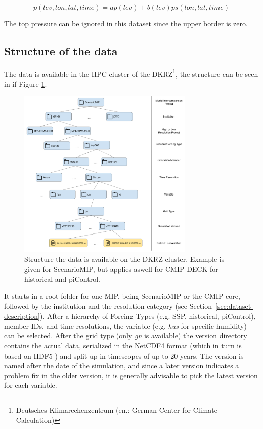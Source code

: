 \begin{equation}
\label{eq:mpige-sigma-hybrid-pressure}
p(lev, lon, lat, time) = ap(lev) + b(lev) ps(lon, lat, time)
\end{equation}


The top pressure can be ignored in this dataset since the upper border is zero.


\subsection{Structure of the data}

The data is available in the HPC cluster of the DKRZ\footnote{Deutsches Klimarechenzentrum (en.: German Center for Climate Calculation)}, the structure can be seen in if Figure \ref{fig:data-structure}.

\begin{figure}[htb]
  \begin{center}
    \includegraphics[width=0.75\textwidth]{figures/data_structure.png}
  \end{center}
  \caption{Structure the data is available on the DKRZ cluster. Example is given for ScenarioMIP, but applies aswell for CMIP DECK for historical and piControl.}\label{fig:data-structure}
\end{figure}

It starts in a root folder for one MIP, being ScenarioMIP or the CMIP core, followed by the institution and the resolution category (see Section~\ref{sec:dataset-description}). 
After a hierarchy of Forcing Types (e.g. SSP, historical, piControl), member IDs, and time resolutions, the variable (e.g. \textit{hus} for specific humidity) can be selected. 
After the grid type (only \textit{gn} is available) the version directory contains the actual data, serialized in the NetCDF4 format (which in turn is based on HDF5 \cite{folk_overview_2011}) and  split up in timescopes of up to 20 years. 
The version is named after the date of the simulation, and since a later version indicates a problem fix in the older version, it is generally advisable to pick the latest version for each variable. 


